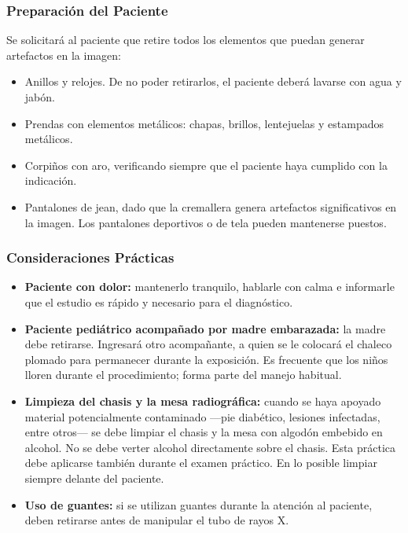 \subsubsection*{Preparación del Paciente}

Se solicitará al paciente que retire todos los elementos que puedan generar
artefactos en la imagen:

\begin{itemize}
    \item Anillos y relojes. De no poder retirarlos, el paciente deberá lavarse
    con agua y jabón.
    \item Prendas con elementos metálicos: chapas, brillos, lentejuelas y
    estampados metálicos.
    \item Corpiños con aro, verificando siempre que el paciente haya cumplido
    con la indicación.
    \item Pantalones de jean, dado que la cremallera genera artefactos
    significativos en la imagen. Los pantalones deportivos o de tela pueden
    mantenerse puestos.
\end{itemize}

\subsubsection*{Consideraciones Prácticas}

\begin{itemize}
    \item \textbf{Paciente con dolor:} mantenerlo tranquilo, hablarle con calma e
    informarle que el estudio es rápido y necesario para el diagnóstico.

    \item \textbf{Paciente pediátrico acompañado por madre embarazada:} la madre
    debe retirarse. Ingresará otro acompañante, a quien se le colocará el chaleco
    plomado para permanecer durante la exposición. Es frecuente que los niños lloren
    durante el procedimiento; forma parte del manejo habitual.

    \item \textbf{Limpieza del chasis y la mesa radiográfica:} cuando se haya
    apoyado material potencialmente contaminado ---pie diabético, lesiones
    infectadas, entre otros--- se debe limpiar el chasis y la mesa con algodón
    embebido en alcohol. No se debe verter alcohol directamente sobre el chasis.
    Esta práctica debe aplicarse también durante el examen práctico.
    En lo posible limpiar siempre delante del paciente.

    \item \textbf{Uso de guantes:} si se utilizan guantes durante la atención al
    paciente, deben retirarse antes de manipular el tubo de rayos X.
\end{itemize}

